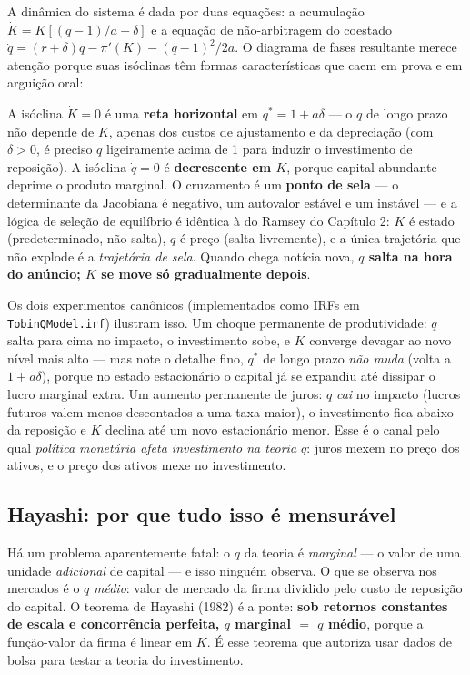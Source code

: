 \documentclass[11pt,a4paper]{article}
\newcommand{\ideia}[1]{\textcolor{destaque}{\textbf{#1}}}
\begin{document}
A dinâmica do sistema é dada por duas equações: a acumulação
$\dot K = K[(q-1)/a - \delta]$ e a equação de não-arbitragem do coestado
$\dot q = (r+\delta)q - \pi'(K) - (q-1)^2/2a$. O diagrama de fases
resultante merece atenção porque suas isóclinas têm formas
características que caem em prova e em arguição oral:

A isóclina $\dot K = 0$ é uma \ideia{reta horizontal} em
$q^* = 1+a\delta$ --- o $q$ de longo prazo não depende de $K$, apenas
dos custos de ajustamento e da depreciação (com $\delta>0$, é preciso
$q$ ligeiramente acima de 1 para induzir o investimento de reposição).
A isóclina $\dot q = 0$ é \ideia{decrescente em $K$}, porque capital
abundante deprime o produto marginal. O cruzamento é um \ideia{ponto de
sela} --- o determinante da Jacobiana é negativo, um autovalor estável e
um instável --- e a lógica de seleção de equilíbrio é idêntica à do
Ramsey do Capítulo 2: $K$ é estado (predeterminado, não salta), $q$ é
preço (salta livremente), e a única trajetória que não explode é a
\emph{trajetória de sela}. Quando chega notícia nova, \ideia{$q$ salta
na hora do anúncio; $K$ se move só gradualmente depois}.

Os dois experimentos canônicos (implementados como IRFs em
\texttt{TobinQModel.irf}) ilustram isso. Um choque permanente de
produtividade: $q$ salta para cima no impacto, o investimento sobe, e
$K$ converge devagar ao novo nível mais alto --- mas note o detalhe fino,
$q^*$ de longo prazo \emph{não muda} (volta a $1+a\delta$), porque no
estado estacionário o capital já se expandiu até dissipar o lucro
marginal extra. Um aumento permanente de juros: $q$ \emph{cai} no
impacto (lucros futuros valem menos descontados a uma taxa maior), o
investimento fica abaixo da reposição e $K$ declina até um novo
estacionário menor. Esse é o canal pelo qual \emph{política monetária
afeta investimento na teoria $q$}: juros mexem no preço dos ativos, e o
preço dos ativos mexe no investimento.

\subsection{Hayashi: por que tudo isso é mensurável}

Há um problema aparentemente fatal: o $q$ da teoria é \emph{marginal} ---
o valor de uma unidade \emph{adicional} de capital --- e isso ninguém
observa. O que se observa nos mercados é o $q$ \emph{médio}: valor de
mercado da firma dividido pelo custo de reposição do capital. O teorema
de Hayashi (1982) é a ponte: \ideia{sob retornos constantes de escala e
concorrência perfeita, $q$ marginal $=$ $q$ médio}, porque a função-valor
da firma é linear em $K$. É esse teorema que autoriza usar dados de bolsa
para testar a teoria do investimento.
\end{document}
